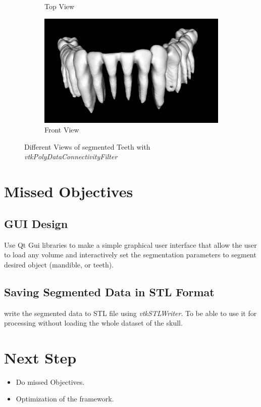 \documentclass[12pt, b5paper]{article}
\begin{document}
\begin{figure}
\begin{subfigure}[b]{0.5\textwidth}
        \caption{Top View}
    \end{subfigure}
    \hfill
    \begin{subfigure}[b]{0.5\textwidth}
        \centering
        \includegraphics[width=\textwidth]{MCF2}
        \caption{Front View}
    \end{subfigure}
    \caption{Different Views of segmented Teeth with \textit{vtkPolyDataConnectivityFilter}}
    \label{fig:PDCF}
\end{figure}

\section{Missed Objectives}
\subsection{GUI Design}
Use Qt Gui libraries to make a simple graphical user interface that allow the user to load any volume and interactively set the segmentation parameters to segment desired object (mandible, or teeth).
\subsection{Saving Segmented Data in STL Format}
write the segmented data to STL file using \textit{vtkSTLWriter}. To be able to use it for processing without loading the whole dataset of the skull.

\section{Next Step}
\begin{itemize}
\item Do missed Objectives.
\item Optimization of the framework.
\end{itemize}
\end{document}
